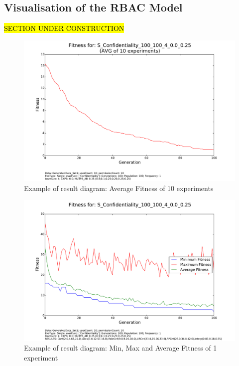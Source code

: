 \iffalse
\subsection{Visualisation of the RBAC Model}
\hl{SECTION UNDER CONSTRUCTION}\\

    \begin{figure}[H]
        \centering
        \includegraphics[scale=0.4]{./Figures/logbook_AVG}
        \caption{Example of result diagram: Average Fitness of 10 experiments}
        \label{fig:logbook_AVG}
    \end{figure}
    
    \begin{figure}[H]
        \centering
        \includegraphics[scale=0.4]{./Figures/testresult1}
        \caption{Example of result diagram: Min, Max and Average Fitness of 1 experiment}
        \label{fig:testresult1}
    \end{figure}
    
